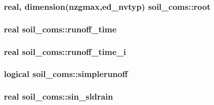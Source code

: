 \subsubsection[{\texorpdfstring{root}{root}}]{\setlength{\rightskip}{0pt plus 5cm}real, dimension(nzgmax,{\bf ed\+\_\+nvtyp}) soil\+\_\+coms\+::root}\hypertarget{namespacesoil__coms_a22f6f63238ed3e10355d0dcc258d2441}{}\label{namespacesoil__coms_a22f6f63238ed3e10355d0dcc258d2441}
\subsubsection[{\texorpdfstring{runoff\+\_\+time}{runoff_time}}]{\setlength{\rightskip}{0pt plus 5cm}real soil\+\_\+coms\+::runoff\+\_\+time}\hypertarget{namespacesoil__coms_a4560c15d785323d98ca7f84a60e07fd2}{}\label{namespacesoil__coms_a4560c15d785323d98ca7f84a60e07fd2}
\subsubsection[{\texorpdfstring{runoff\+\_\+time\+\_\+i}{runoff_time_i}}]{\setlength{\rightskip}{0pt plus 5cm}real soil\+\_\+coms\+::runoff\+\_\+time\+\_\+i}\hypertarget{namespacesoil__coms_abbda4cf2bb85860666afd7f70310f519}{}\label{namespacesoil__coms_abbda4cf2bb85860666afd7f70310f519}
\subsubsection[{\texorpdfstring{simplerunoff}{simplerunoff}}]{\setlength{\rightskip}{0pt plus 5cm}logical soil\+\_\+coms\+::simplerunoff}\hypertarget{namespacesoil__coms_ae8cfc7c2c5c0a303067e834b6ba03694}{}\label{namespacesoil__coms_ae8cfc7c2c5c0a303067e834b6ba03694}
\subsubsection[{\texorpdfstring{sin\+\_\+sldrain}{sin_sldrain}}]{\setlength{\rightskip}{0pt plus 5cm}real soil\+\_\+coms\+::sin\+\_\+sldrain}\hypertarget{namespacesoil__coms_a7162076a5aaec83255f06fe55f799e31}{}\label{namespacesoil__coms_a7162076a5aaec83255f06fe55f799e31}
